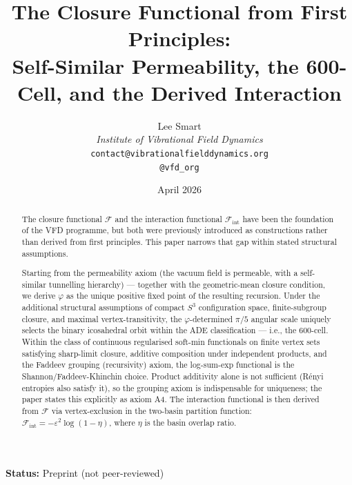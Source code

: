 \documentclass[12pt]{article}
\title{The Closure Functional from First Principles:\\[6pt]
\large Self-Similar Permeability, the 600-Cell, and the Derived Interaction}
\author{%
  Lee Smart\\[4pt]
  \textit{Institute of Vibrational Field Dynamics}\\[2pt]
  \texttt{contact@vibrationalfielddynamics.org}\\[2pt]
  \texttt{@vfd\_org}%
}
\date{April 2026}
\newcommand{\Fcal}{\mathcal{F}}
\newcommand{\Fint}{\Fcal_{\mathrm{int}}}
\newcommand{\phig}{\varphi}
\begin{document}
\maketitle

\noindent\textbf{Status:} Preprint (not peer-reviewed)

\begin{abstract}
The closure functional $\Fcal$ and the interaction functional $\Fint$ have been
the foundation of the VFD programme, but both were previously
introduced as constructions rather than derived from first principles.
This paper narrows that gap within stated structural assumptions.

Starting from the permeability axiom (the vacuum field is permeable, with a self-similar tunnelling hierarchy) --- together with
the geometric-mean closure condition, we derive $\phig$ as the unique
positive fixed point of the resulting recursion. Under the additional
structural assumptions of compact $S^3$ configuration space,
finite-subgroup closure, and maximal vertex-transitivity, the
$\phig$-determined $\pi/5$ angular scale uniquely selects the binary
icosahedral orbit within the ADE classification --- i.e., the 600-cell.
Within the class of continuous regularised soft-min functionals on
finite vertex sets satisfying sharp-limit closure, additive
composition under independent products, and the Faddeev grouping
(recursivity) axiom, the log-sum-exp functional is the Shannon/Faddeev-Khinchin choice. Product additivity alone is not sufficient (R\'enyi entropies also satisfy it), so the grouping axiom is indispensable for uniqueness; the paper states this explicitly as axiom A4. The interaction functional is
then derived from $\Fcal$ via vertex-exclusion in the two-basin
partition function: $\Fint = -\varepsilon^2\log(1 - \eta)$, where
$\eta$ is the basin overlap ratio.


\end{abstract}
\end{document}
